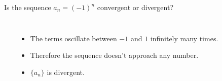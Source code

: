 \begin{frame}
\begin{example}[Example 6, p. 715]
Is the sequence $a_n = (-1)^n$ convergent or divergent?
\begin{columns}[c]
\ %
%
\begin{itemize}
\item<2->  The terms oscillate between $-1$ and $1$ infinitely many times.
\item<3->  Therefore the sequence doesn't approach any number.
\item<4->  $\{ a_n\}$ is divergent.
\end{itemize}
\end{columns}
\end{example}
\end{frame}
